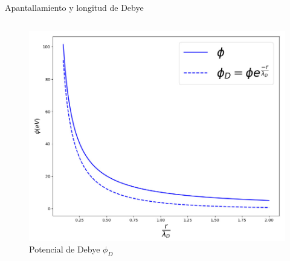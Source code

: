 \documentclass[11pt]{beamer}
\begin{document}
\begin{frame}{Apantallamiento y longitud de Debye}
\begin{columns}
        \begin{column}{0.5\textwidth}
        \begin{figure}
            \centering
            \includegraphics[width=\textwidth]{Potencial_modificado.jpg}
            \caption{Potencial de Debye $\phi_D$}
            \label{fig:imag1}
        \end{figure}
        \end{column}
        \end{columns}
        
        \end{frame}
        
\end{document}
